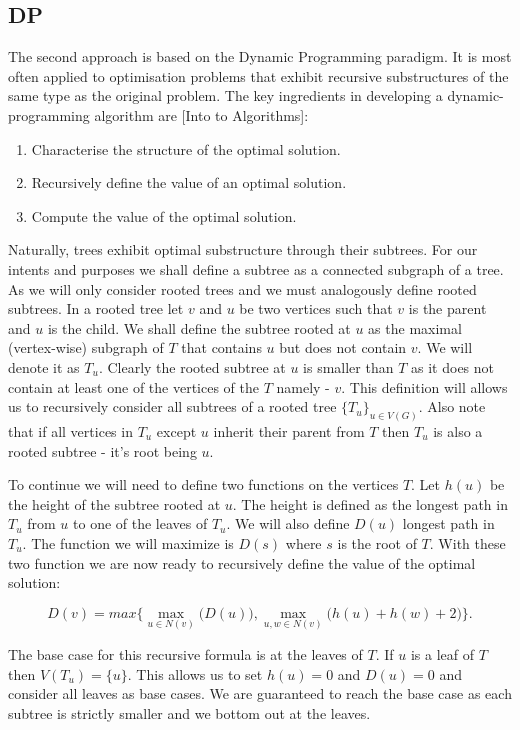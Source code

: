 \subsection{DP}

The second approach is based on the Dynamic Programming paradigm. It is most often applied to optimisation problems that exhibit recursive substructures of the same type as the original problem. The key ingredients in developing a dynamic-programming algorithm are [Into to Algorithms]:


\begin{enumerate}
    \item Characterise the structure of the optimal solution.
    \item Recursively define the value of an optimal solution.
    \item Compute the value of the optimal solution.
\end{enumerate}


Naturally, trees exhibit optimal substructure through their subtrees. For our intents and purposes we shall define a subtree as a connected subgraph of a tree. As we will only consider rooted trees and we must analogously define rooted subtrees. In a rooted tree let $v$ and $u$ be two vertices such that $v$ is the parent and $u$ is the child. We shall define the subtree rooted at $u$ as the maximal (vertex-wise) subgraph of $T$ that contains $u$ but does not contain $v$. We will denote it as $T_u$. Clearly the rooted subtree at $u$ is smaller than $T$ as it does not contain at least one of the vertices of the $T$ namely - $v$. This definition will allows us to recursively consider all subtrees of a rooted tree $\{T_u\}_{u \in V(G)}$. Also note that if all vertices in $T_u$ except $u$ inherit their parent from $T$ then $T_u$ is also a rooted subtree - it's root being $u$.

To continue we will need to define two functions on the vertices $T$. Let $h(u)$ be the height of the subtree rooted at $u$. The height is defined as the longest path in $T_u$ from $u$ to one of the leaves of $T_u$. We will also define $D(u)$ longest path in $T_u$. The function we will maximize is $D(s)$ where $s$ is the root of $T$. With these two function we are now ready to recursively define the value of the optimal solution:

$$ D(v) = max\bigg\{ \max\limits_{u \in N(v)}\bigg(D(u)\bigg), \max\limits_{u, w \in N(v)}\bigg(h(u) + h(w) + 2\bigg) \bigg\}. $$

The base case for this recursive formula is at the leaves of $T$. If $u$ is a leaf of $T$ then $V(T_u) = \{u\}$. This allows us to set $h(u) = 0$ and $D(u) = 0$ and consider all leaves as base cases. We are guaranteed to reach the base case as each subtree is strictly smaller and we bottom out at the leaves.

